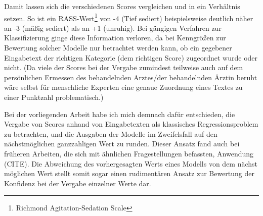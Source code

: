 Damit lassen sich die verschiedenen Scores vergleichen und in ein Verhältnis setzen. So ist ein RASS-Wert\footnote{Richmond Agitation-Sedation Scale} von -4 (Tief sediert) beispielsweise deutlich näher an -3 (mäßig sediert) als an +1 (unruhig). Bei gängigen Verfahren zur Klassifizierung ginge diese Information verloren, da bei Kenngrößen zur Bewertung solcher Modelle nur betrachtet werden kann, ob ein gegebener Eingabetext der richtigen Kategorie (dem richtigen Score) zugeordnet wurde oder nicht. (Da viele der Scores bei der Vergabe zumindest teilweise auch auf dem persönlichen Ermessen des behandelnden Arztes/der behandelnden Ärztin beruht wäre selbst für menschliche Experten eine genaue Zuordnung eines Textes zu einer Punktzahl problematisch.)

Bei der vorliegenden Arbeit habe ich mich demnach dafür entschieden, die Vergabe von Scores anhand von Eingabetexten als klassisches Regressionsproblem zu betrachten, und die Ausgaben der Modelle im Zweifelsfall auf den nächstmöglichen ganzzahligen Wert zu runden. Dieser Ansatz fand auch bei früheren Arbeiten, die sich mit ähnlichen Fragestellungen befassten, Anwendung (CITE). Die Abweichung des vorhergesagten Werts eines Modells von dem nächst möglichen Wert stellt somit sogar einen rudimentären Ansatz zur Bewertung der Konfidenz bei der Vergabe einzelner Werte dar.



